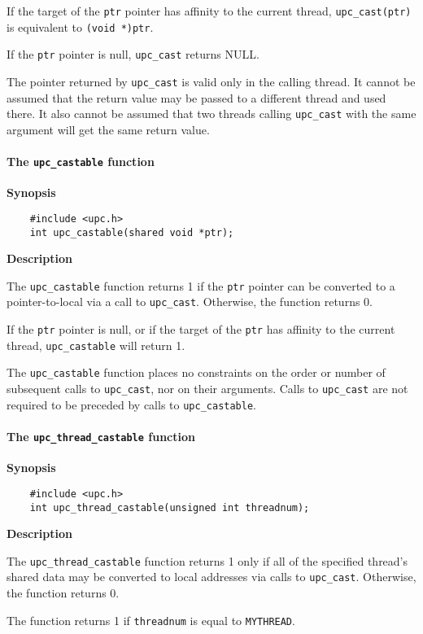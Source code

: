 \np If the target of the {\tt ptr} pointer has affinity to the current
thread, {\tt upc\_cast(ptr)} is equivalent to {\tt (void *)ptr}.

\np If the {\tt ptr} pointer is null, {\tt upc\_cast} returns NULL.

\np The pointer returned by {\tt upc\_cast} is valid only in the calling
thread.  It cannot be assumed that the return value may be passed to
a different thread and used there.  It also cannot be assumed that two
threads calling {\tt upc\_cast} with the same argument will get the same
return value.

\paragraph{The {\tt upc\_castable} function}

{\bf Synopsis}

\npf\vspace{-2.5em}
\begin{verbatim}
    #include <upc.h>
    int upc_castable(shared void *ptr);
\end{verbatim}

{\bf Description}

The {\tt upc\_castable} function returns 1 if the {\tt ptr} pointer
can be converted to a pointer-to-local via a call to {\tt upc\_cast}.
Otherwise, the function returns 0.

If the {\tt ptr} pointer is null, or if the target of the {\tt ptr} has
affinity to the current thread, {\tt upc\_castable} will return 1.

The {\tt upc\_castable} function places no constraints on the order or
number of subsequent calls to {\tt upc\_cast}, nor on their arguments.
Calls to {\tt upc\_cast} are not required to be preceded by calls to
{\tt upc\_castable}.

\paragraph{The {\tt upc\_thread\_castable} function}

{\bf Synopsis}

\npf\vspace{-2.5em}
\begin{verbatim}
    #include <upc.h>
    int upc_thread_castable(unsigned int threadnum);
\end{verbatim}

{\bf Description}

The {\tt upc\_thread\_castable} function returns 1 only if all of the
specified thread's shared data may be converted to local addresses
via calls to {\tt upc\_cast}.  Otherwise, the function returns 0.

The function returns 1 if {\tt threadnum} is equal to {\tt MYTHREAD}.

\pagebreak
\appendix

